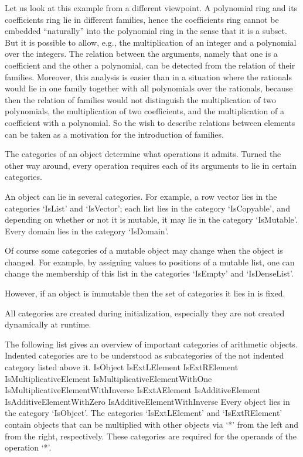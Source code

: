 Let us look at this example from a different viewpoint.
A polynomial ring and its coefficients ring lie in different families,
hence the coefficients ring cannot be embedded ``naturally'' into the
polynomial ring in the sense that it is a subset.
But it is possible to allow, e.g., the multiplication of an integer
and a polynomial over the integers.
The relation between the arguments,
namely that one is a coefficient and the other a polynomial,
can be detected from the relation of their families.
Moreover, this analysis is easier than in a situation where the rationals
would lie in one family together with all polynomials over the rationals,
because then the relation of families would not distinguish
the multiplication of two polynomials,
the multiplication of two coefficients,
and the multiplication of a coefficient with a polynomial.
So the wish to describe relations between elements
can be taken as a motivation for the introduction of families.


The categories of an object determine what operations it admits.
Turned the other way around, every operation requires each of its
arguments to lie in certain categories.

An object can lie in several categories.
For example, a row vector lies in the categories `IsList' and `IsVector';
each list lies in the category `IsCopyable',
and depending on whether or not it is mutable, it may lie in the category
`IsMutable'.
Every domain lies in the category `IsDomain'.

Of course some categories of a mutable object may change when the object
is changed.
For example, by assigning values to positions of a mutable list,
one can change the membership of this list in the categories `IsEmpty'
and `IsDenseList'.

However, if an object is immutable then the set of categories it lies in
is fixed.

All categories are created during initialization,
especially they are not created dynamically at runtime.

The following list gives an overview of important categories of
arithmetic objects.
Indented categories are to be understood as subcategories of the not
indented category listed above it.
\begintt
    IsObject
        IsExtLElement
        IsExtRElement
            IsMultiplicativeElement
                IsMultiplicativeElementWithOne
                    IsMultiplicativeElementWithInverse
        IsExtAElement
            IsAdditiveElement
                IsAdditiveElementWithZero
                    IsAdditiveElementWithInverse
\endtt
Every object lies in the category `IsObject'.
The categories `IsExtLElement' and `IsExtRElement' contain objects
that can be multiplied with other objects via `*' from the left and
from the right, respectively.
These categories are required for the operands of the operation `*'.

